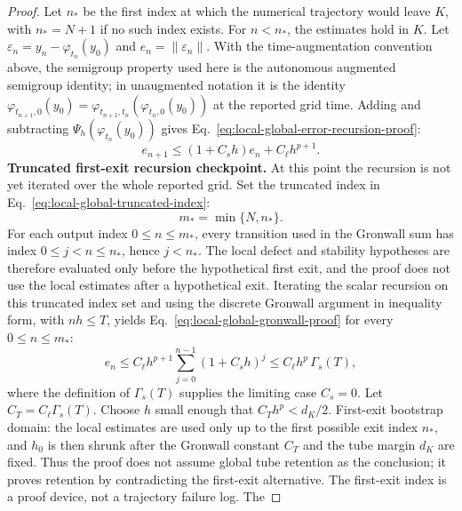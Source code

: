 \documentclass[preprint,12pt]{elsarticle}
\begin{document}
\begin{proof}
Let \(n_\ast\) be the first index at which the numerical trajectory would
leave \(K\), with \(n_\ast=N+1\) if no such index exists. For
\(n<n_\ast\), the estimates hold in \(K\). Let
\(\varepsilon_n=y_n-\varphi_{t_n}(y_0)\) and
\(e_n=\|\varepsilon_n\|\).  With the time-augmentation convention above,
the semigroup property used here is the autonomous augmented semigroup
identity; in unaugmented notation it is the identity
\(\varphi_{t_{n+1},0}(y_0)
=\varphi_{t_{n+1},t_n}(\varphi_{t_n,0}(y_0))\) at the reported grid time.
Adding and subtracting
$\Psi_h(\varphi_{t_n}(y_0))$ gives
Eq.~\eqref{eq:local-global-error-recursion-proof}:
\begin{equation}
\label{eq:local-global-error-recursion-proof}
  e_{n+1}
  \le (1+C_s h)e_n+C_\ell h^{p+1}.
\end{equation}
\noindent\textbf{Truncated first-exit recursion checkpoint.}
At this point the recursion is not yet iterated over the whole reported grid.
Set the truncated index in Eq.~\eqref{eq:local-global-truncated-index}:
\begin{equation}
\label{eq:local-global-truncated-index}
  m_\ast=\min\{N,n_\ast\}.
\end{equation}
For each output index \(0\le n\le m_\ast\), every transition used in the
Gronwall sum has index \(0\le j<n\le n_\ast\), hence \(j<n_\ast\).  The local
defect and stability hypotheses are therefore evaluated only before the
hypothetical first exit, and the proof does not use the local estimates after
a hypothetical exit.  Iterating the scalar recursion on this truncated index
set and using the discrete Gronwall argument in inequality form, with
\(n h\le T\), yields Eq.~\eqref{eq:local-global-gronwall-proof} for every
\(0\le n\le m_\ast\):
\begin{equation}
\label{eq:local-global-gronwall-proof}
  e_n
  \le C_\ell h^{p+1}\sum_{j=0}^{n-1}(1+C_s h)^j
  \le C_\ell h^p\,\Gamma_s(T),
\end{equation}
where the definition of \(\Gamma_s(T)\) supplies the limiting case
\(C_s=0\). Let \(C_T=C_\ell\Gamma_s(T)\). Choose \(h\) small enough that
\(C_T h^p<d_K/2\).
First-exit bootstrap domain: the local estimates are used only up to the
first possible exit index \(n_\ast\), and \(h_0\) is then shrunk after
the Gronwall constant \(C_T\) and the tube margin \(d_K\) are fixed.
Thus the proof does not assume global tube retention as the conclusion;
it proves retention by contradicting the first-exit alternative. The
first-exit index is a proof device, not a trajectory failure log. The

\end{proof}
\end{document}
